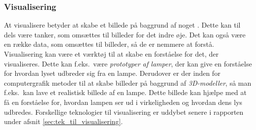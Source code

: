 \subsubsection{Visualisering}
At visualisere betyder at skabe et billede på baggrund af noget \cite{ddo_visualisering}. Dette kan til dels være tanker, som omsættes til billeder for det indre øje. Det kan også være en række data, som omsættes til billeder, så de er nemmere at forstå.
Visualisering kan være et værktøj til at skabe en forståelse for det, der visualiseres. Dette kan f.eks.\ være \textit{prototyper af lamper}, der kan give en forståelse for hvordan lyset udbreder sig fra en lampe. Derudover er der inden for computergrafik metoder til at skabe billeder på baggrund af \textit{3D-modeller}, så man f.eks.\ kan lave et realistisk billede af en lampe. Dette billede kan hjælpe med at få en forståelse for, hvordan lampen ser ud i virkeligheden og hvordan dens lys udbredes. Forskellige teknologier til visualisering er uddybet senere i rapporten under afsnit \ref{sec:tek_til_visualisering}. 
